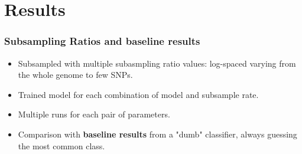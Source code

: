 \documentclass[aspectratio=169]{beamer}
\begin{document}
\section{Results}
\begin{frame}
\frametitle{Subsampling Ratios and baseline results}
\begin{itemize}
    \item Subsampled with multiple subasmpling ratio values: log-spaced varying from the whole genome to few SNPs.

\begin{center}
\end{center}

  \item Trained model for each combination of model and subsample rate.
  \item Multiple runs for each pair of parameters.
  \item Comparison with \textbf{baseline results} from a "dumb" classifier, always guessing the most common class.
\end{itemize}

\vspace{0.2cm}
\end{frame}
\end{document}
